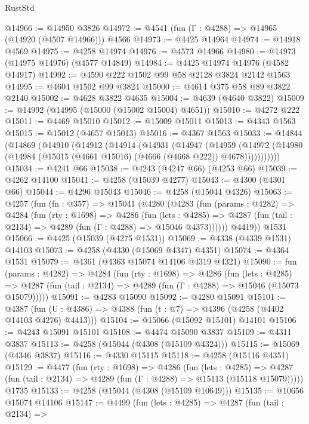 \begin{lexlean}{RustStd}
\begin{coremodule}
@14966 := @14950 @3826
@14972 := @4541 (fun (Γ : @4288) => @14965 (@14920 (@4507 @14966))) @4566
@14973 := @4425 @14964
@14974 := @14918 @4569
@14975 := @4258 @14974
@14976 := @4573 @14966
@14980 := @14973 (@14975 @14976) (@4577 @14849)
@14984 := @4425 @14974 @14976 (@4582 @14917)
@14992 := @4590 @222 @1502 @99 @58 @2128 @3824 @2142 @1563
@14995 := @4604 @1502 @99 @3824
@15000 := @4614 @375 @58 @89 @3822 @2140
@15002 := @4628 @3822 @4635
@15004 := @4639 (@4640 @3822)
@15009 := @14992 (@14995 (@15000 (@15002 @15004) @4651))
@15010 := @4272 @222
@15011 := @4469 @15010
@15012 := @15009 @15011
@15013 := @4343 @1563
@15015 := @15012 (@4657 @15013)
@15016 := @4367 @1563
@15033 := @14844
    (@14869
      (@14910
        (@14912
          (@14914
            (@14931
              (@14947
                (@14959
                  (@14972
                    (@14980 (@14984 (@15015 (@4661 @15016) (@4666 (@4668 @222)) @4678)))))))))))
@15034 := @4241 @66
@15038 := @4243 (@4247 @66) (@4253 @66)
@15039 := @4262 @14100
@15041 := @4258 (@15039 @4277)
@15043 := @4300 (@4301 @66)
@15044 := @4296 @15043
@15046 := @4258 (@15044 @4326)
@15063 := @4257
    (fun (fn : @357) =>
    @15041
      (@4280
        (@4283
          (fun (params : @4282) =>
          @4284
            (fun (rty : @1698) =>
            @4286
              (fun (lets : @4285) =>
              @4287 (fun (tail : @2134) => @4289 (fun (Γ : @4288) => @15046 @4373))))))
        @4419))
    @1531
@15066 := @4425 (@15039 (@4275 @1531))
@15069 := @4338 (@4339 @1531) @14103
@15073 := @4258 (@4330 (@15069 @4347) @4351)
@15074 := @4364 @1531
@15079 := @4361 (@4363 @15074 @14106 @4319 @4321)
@15090 := fun (params : @4282) =>
  @4284
    (fun (rty : @1698) =>
    @4286
      (fun (lets : @4285) =>
      @4287 (fun (tail : @2134) => @4289 (fun (Γ : @4288) => @15046 (@15073 @15079)))))
@15091 := @4283 @15090
@15092 := @4280 @15091
@15101 := @4387
    (fun (U : @4386) => @4388 (fun (t : @7) => @4396 (@4258 (@4402 @14103 @4276) @4413)))
@15104 := @15066 (@15092 @15101) @14101
@15106 := @4243 @15091 @15101
@15108 := @4474 @15090 @3837
@15109 := @4311 @3837
@15113 := @4258 (@15044 (@4308 (@15109 @4324)))
@15115 := @15069 (@4346 @3837)
@15116 := @4330 @15115
@15118 := @4258 (@15116 @4351)
@15129 := @4477
    (fun (rty : @1698) =>
    @4286
      (fun (lets : @4285) =>
      @4287 (fun (tail : @2134) => @4289 (fun (Γ : @4288) => @15113 (@15118 @15079)))))
    @1735
@15133 := @4258 (@15044 (@4308 (@15109 @10649)))
@15135 := @10656 @15074 @14106
@15147 := @4499
    (fun (lets : @4285) =>
    @4287
      (fun (tail : @2134) =>

\end{coremodule}
\end{lexlean}
